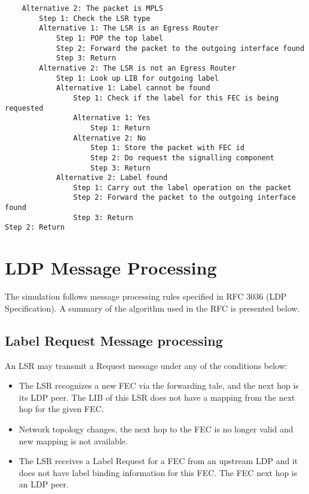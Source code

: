 \begin{verbatim}
    Alternative 2: The packet is MPLS
        Step 1: Check the LSR type
        Alternative 1: The LSR is an Egress Router
            Step 1: POP the top label
            Step 2: Forward the packet to the outgoing interface found
            Step 3: Return
        Alternative 2: The LSR is not an Egress Router
            Step 1: Look up LIB for outgoing label
            Alternative 1: Label cannot be found
                Step 1: Check if the label for this FEC is being requested
                Alternative 1: Yes
                    Step 1: Return
                Alternative 2: No
                    Step 1: Store the packet with FEC id
                    Step 2: Do request the signalling component
                    Step 3: Return
            Alternative 2: Label found
                Step 1: Carry out the label operation on the packet
                Step 2: Forward the packet to the outgoing interface found
                Step 3: Return
Step 2: Return
\end{verbatim}


\section{LDP Message Processing}

The simulation follows message processing rules specified in RFC 3036
(LDP Specification). A summary of the algorithm used in the RFC is
presented below.

\subsection{Label Request Message processing}

An LSR may transmit a Request message under any of the conditions below:

\begin{itemize}
  \item The LSR recognizes a new FEC via the forwarding tale, and the next hop
    is its LDP peer. The LIB of this LSR does not have a mapping from the
    next hop for the given FEC.
  \item Network topology changes, the next hop to the FEC is no longer valid
    and new mapping is not available.
  \item The LSR receives a Label Request for a FEC from an upstream LDP and it
    does not have label binding information for this FEC. The FEC next hop
    is an LDP peer.
\end{itemize}

